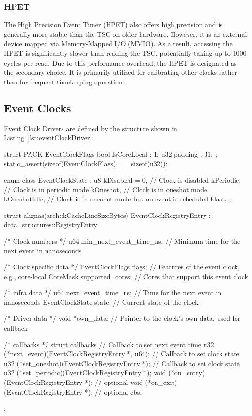 \documentclass[a4paper,10pt,twoside]{report}
\theoremstyle{definition}
\begin{document}
\subsubsection{HPET}
The High Precision Event Timer (HPET) also offers high precision and is generally more stable than the TSC on older hardware. However, it is an external device mapped via Memory-Mapped I/O (MMIO). As a result, accessing the HPET is significantly slower than reading the TSC, potentially taking up to 1000 cycles per read. Due to this performance overhead, the HPET is designated as the secondary choice. It is primarily utilized for calibrating other clocks rather than for frequent timekeeping operations.

\clearpage

\subsection{Event Clocks}

Event Clock Drivers are defined by the structure shown in Listing~\ref{lst:eventClockDriver}:

\begin{cppcode}[caption={Event Clock Driver Structure}, label={lst:eventClockDriver}]
struct PACK EventClockFlags {
    bool IsCoreLocal : 1;
    u32 padding : 31;
};
static_assert(sizeof(EventClockFlags) == sizeof(u32));

enum class EventClockState : u8 {
    kDisabled = 0,  // Clock is disabled
    kPeriodic,      // Clock is in periodic mode
    kOneshot,       // Clock is in oneshot mode
    kOneshotIdle,   // Clock is in oneshot mode but no event is scheduled
    klast,
};

struct alignas(arch::kCacheLineSizeBytes) EventClockRegistryEntry : data_structures::RegistryEntry {
    /* Clock numbers */
    u64 min_next_event_time_ns;  // Minimum time for the next event in nanoseconds

    /* Clock specific data */
    EventClockFlags flags;     // Features of the event clock, e.g., core-local
    CoreMask supported_cores;  // Cores that support this event clock

    /* infra data */
    u64 next_event_time_ns;  // Time for the next event in nanoseconds
    EventClockState state;   // Current state of the clock

    /* Driver data */
    void *own_data;  // Pointer to the clock's own data, used for callback

    /* callbacks */
    struct callbacks {
        // Callback to set next event time
        u32 (*next_event)(EventClockRegistryEntry *, u64);  
        // Callback to set clock state
        u32 (*set_oneshot)(EventClockRegistryEntry *);
        // Callback to set clock state
        u32 (*set_periodic)(EventClockRegistryEntry *);     
        void (*on_entry)(EventClockRegistryEntry *);        // optional
        void (*on_exit)(EventClockRegistryEntry *);         // optional
    } cbs;
};
\end{cppcode}
\end{document}
